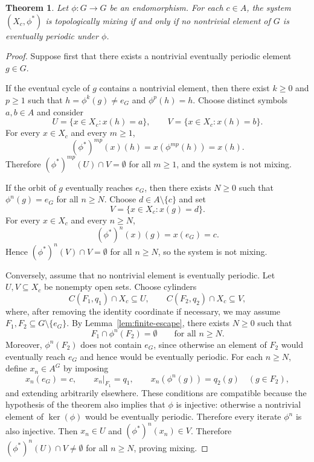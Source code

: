 \documentclass[12pt,a4paper]{article}
\newtheorem{theorem}{Theorem}[section]
\theoremstyle{definition}
\theoremstyle{remark}
\begin{document}
\begin{theorem}\label{thm:general-mixing}
Let $\phi:G\to G$ be an endomorphism. For each $c\in A$, the system $(X_c,\phi^*)$ is topologically mixing if and only if no nontrivial element of $G$ is eventually periodic under $\phi$.
\end{theorem}

\begin{proof}
Suppose first that there exists a nontrivial eventually periodic element $g\in G$.

If the eventual cycle of $g$ contains a nontrivial element, then there exist $k\geq 0$ and $p\geq 1$ such that $h=\phi^k(g)\neq e_G$ and $\phi^p(h)=h$. Choose distinct symbols $a,b\in A$ and consider
\[
U=\{x\in X_c:x(h)=a\},
\qquad
V=\{x\in X_c:x(h)=b\}.
\]
For every $x\in X_c$ and every $m\geq 1$,
\[
(\phi^*)^{mp}(x)(h)=x(\phi^{mp}(h))=x(h).
\]
Therefore $(\phi^*)^{mp}(U)\cap V=\emptyset$ for all $m\geq 1$, and the system is not mixing.

If the orbit of $g$ eventually reaches $e_G$, then there exists $N\geq 0$ such that $\phi^n(g)=e_G$ for all $n\geq N$. Choose $d\in A\setminus\{c\}$ and set
\[
V=\{x\in X_c:x(g)=d\}.
\]
For every $x\in X_c$ and every $n\geq N$,
\[
(\phi^*)^n(x)(g)=x(e_G)=c.
\]
Hence $(\phi^*)^n(V)\cap V=\emptyset$ for all $n\geq N$, so the system is not mixing.

Conversely, assume that no nontrivial element is eventually periodic. Let $U,V\subseteq X_c$ be nonempty open sets. Choose cylinders
\[
C(F_1,q_1)\cap X_c\subseteq U,
\qquad
C(F_2,q_2)\cap X_c\subseteq V,
\]
where, after removing the identity coordinate if necessary, we may assume $F_1,F_2\subseteq G\setminus\{e_G\}$. By Lemma~\ref{lem:finite-escape}, there exists $N\geq 0$ such that
\[
F_1\cap \phi^n(F_2)=\emptyset
\qquad\text{for all }n\geq N.
\]
Moreover, $\phi^n(F_2)$ does not contain $e_G$, since otherwise an element of $F_2$ would eventually reach $e_G$ and hence would be eventually periodic. For each $n\geq N$, define $x_n\in A^G$ by imposing
\[
x_n(e_G)=c,
\qquad
x_n|_{F_1}=q_1,
\qquad
x_n(\phi^n(g))=q_2(g)\quad (g\in F_2),
\]
and extending arbitrarily elsewhere. These conditions are compatible because the hypothesis of the theorem also implies that $\phi$ is injective: otherwise a nontrivial element
of $\ker(\phi)$ would be eventually periodic. Therefore every iterate $\phi^n$ is also injective. Then $x_n\in U$ and $(\phi^*)^n(x_n)\in V$. Therefore $(\phi^*)^n(U)\cap V\neq\emptyset$ for all $n\geq N$, proving mixing.
\end{proof}
\end{document}
